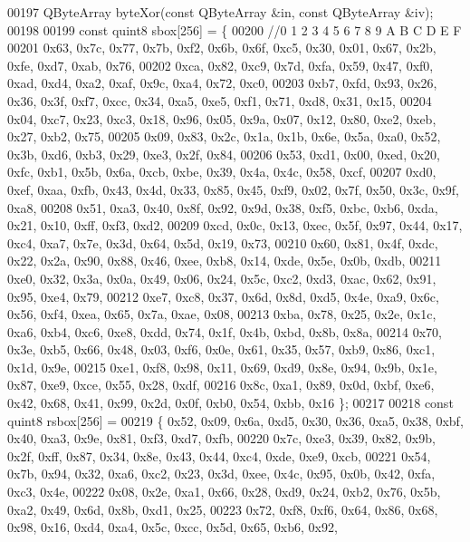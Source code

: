 \begin{DoxyCode}
00197     QByteArray byteXor(\textcolor{keyword}{const} QByteArray &in, \textcolor{keyword}{const} QByteArray &iv);
00198 
00199     \textcolor{keyword}{const} quint8 sbox[256] =   \{
00200       \textcolor{comment}{//0     1    2      3     4    5     6     7      8    9     A      B    C     D     E     F}
00201       0x63, 0x7c, 0x77, 0x7b, 0xf2, 0x6b, 0x6f, 0xc5, 0x30, 0x01, 0x67, 0x2b, 0xfe, 0xd7, 0xab, 0x76,
00202       0xca, 0x82, 0xc9, 0x7d, 0xfa, 0x59, 0x47, 0xf0, 0xad, 0xd4, 0xa2, 0xaf, 0x9c, 0xa4, 0x72, 0xc0,
00203       0xb7, 0xfd, 0x93, 0x26, 0x36, 0x3f, 0xf7, 0xcc, 0x34, 0xa5, 0xe5, 0xf1, 0x71, 0xd8, 0x31, 0x15,
00204       0x04, 0xc7, 0x23, 0xc3, 0x18, 0x96, 0x05, 0x9a, 0x07, 0x12, 0x80, 0xe2, 0xeb, 0x27, 0xb2, 0x75,
00205       0x09, 0x83, 0x2c, 0x1a, 0x1b, 0x6e, 0x5a, 0xa0, 0x52, 0x3b, 0xd6, 0xb3, 0x29, 0xe3, 0x2f, 0x84,
00206       0x53, 0xd1, 0x00, 0xed, 0x20, 0xfc, 0xb1, 0x5b, 0x6a, 0xcb, 0xbe, 0x39, 0x4a, 0x4c, 0x58, 0xcf,
00207       0xd0, 0xef, 0xaa, 0xfb, 0x43, 0x4d, 0x33, 0x85, 0x45, 0xf9, 0x02, 0x7f, 0x50, 0x3c, 0x9f, 0xa8,
00208       0x51, 0xa3, 0x40, 0x8f, 0x92, 0x9d, 0x38, 0xf5, 0xbc, 0xb6, 0xda, 0x21, 0x10, 0xff, 0xf3, 0xd2,
00209       0xcd, 0x0c, 0x13, 0xec, 0x5f, 0x97, 0x44, 0x17, 0xc4, 0xa7, 0x7e, 0x3d, 0x64, 0x5d, 0x19, 0x73,
00210       0x60, 0x81, 0x4f, 0xdc, 0x22, 0x2a, 0x90, 0x88, 0x46, 0xee, 0xb8, 0x14, 0xde, 0x5e, 0x0b, 0xdb,
00211       0xe0, 0x32, 0x3a, 0x0a, 0x49, 0x06, 0x24, 0x5c, 0xc2, 0xd3, 0xac, 0x62, 0x91, 0x95, 0xe4, 0x79,
00212       0xe7, 0xc8, 0x37, 0x6d, 0x8d, 0xd5, 0x4e, 0xa9, 0x6c, 0x56, 0xf4, 0xea, 0x65, 0x7a, 0xae, 0x08,
00213       0xba, 0x78, 0x25, 0x2e, 0x1c, 0xa6, 0xb4, 0xc6, 0xe8, 0xdd, 0x74, 0x1f, 0x4b, 0xbd, 0x8b, 0x8a,
00214       0x70, 0x3e, 0xb5, 0x66, 0x48, 0x03, 0xf6, 0x0e, 0x61, 0x35, 0x57, 0xb9, 0x86, 0xc1, 0x1d, 0x9e,
00215       0xe1, 0xf8, 0x98, 0x11, 0x69, 0xd9, 0x8e, 0x94, 0x9b, 0x1e, 0x87, 0xe9, 0xce, 0x55, 0x28, 0xdf,
00216       0x8c, 0xa1, 0x89, 0x0d, 0xbf, 0xe6, 0x42, 0x68, 0x41, 0x99, 0x2d, 0x0f, 0xb0, 0x54, 0xbb, 0x16 \};
00217 
00218     \textcolor{keyword}{const} quint8 rsbox[256] =
00219     \{ 0x52, 0x09, 0x6a, 0xd5, 0x30, 0x36, 0xa5, 0x38, 0xbf, 0x40, 0xa3, 0x9e, 0x81, 0xf3, 0xd7, 0xfb,
00220       0x7c, 0xe3, 0x39, 0x82, 0x9b, 0x2f, 0xff, 0x87, 0x34, 0x8e, 0x43, 0x44, 0xc4, 0xde, 0xe9, 0xcb,
00221       0x54, 0x7b, 0x94, 0x32, 0xa6, 0xc2, 0x23, 0x3d, 0xee, 0x4c, 0x95, 0x0b, 0x42, 0xfa, 0xc3, 0x4e,
00222       0x08, 0x2e, 0xa1, 0x66, 0x28, 0xd9, 0x24, 0xb2, 0x76, 0x5b, 0xa2, 0x49, 0x6d, 0x8b, 0xd1, 0x25,
00223       0x72, 0xf8, 0xf6, 0x64, 0x86, 0x68, 0x98, 0x16, 0xd4, 0xa4, 0x5c, 0xcc, 0x5d, 0x65, 0xb6, 0x92,

\end{DoxyCode}
